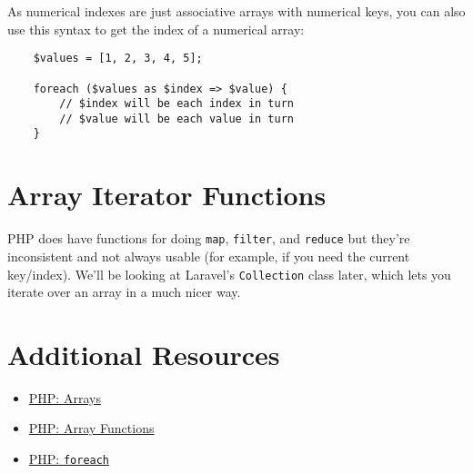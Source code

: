 As numerical indexes are just associative arrays with numerical keys, you can also use this syntax to get the index of a numerical array:

\begin{verbatim}
    $values = [1, 2, 3, 4, 5];

    foreach ($values as $index => $value) {
        // $index will be each index in turn
        // $value will be each value in turn
    }
\end{verbatim}

\section{Array Iterator Functions}

PHP does have functions for doing \texttt{map}, \texttt{filter}, and \texttt{reduce} but they're inconsistent and not always usable (for example, if you need the current key/index). We'll be looking at Laravel's \texttt{Collection} class later, which lets you iterate over an array in a much nicer way.




\section{Additional Resources}

\begin{itemize}[leftmargin=*]
    \item \href{http://www.php.net/manual/en/language.types.array.php}{PHP: Arrays}
    \item \href{https://www.php.net/manual/en/ref.array.php}{PHP: Array Functions}
    \item \href{http://www.php.net/manual/en/control-structures.foreach.php}{PHP: \texttt{foreach}}
\end{itemize}
